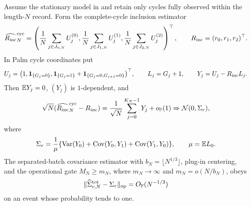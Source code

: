 \begin{paperthm}\label{thm:finite-record-inference-audit-main}
Assume the stationary model in  and
retain only cycles fully observed within the length-\(N\) record.  Form the
complete-cycle inclusion estimator
\[
\widehat{R_{\mathrm{inc}}}_N^{\rm cyc}
=\left(\frac1N\sum_{j\in J_{0,N}}U_j^{(0)},
       \frac1N\sum_{j\in J_{1,N}}U_j^{(1)},
       \frac1N\sum_{j\in J_{2,N}}U_j^{(2)}\right)^\top ,
\qquad
R_{\mathrm{inc}}=(r_0,r_1,r_2)^\top .
\]
In Palm cycle coordinates put
\[
U_j=
\bigl(1,\mathbf1_{\{G_j=0\}},
\mathbf1_{\{G_j=1\}}+\mathbf1_{\{G_j=0,G_{j+1}=0\}}\bigr)^\top,
\qquad
L_j=G_j+1,\qquad
Y_j=U_j-R_{\mathrm{inc}} L_j .
\]
Then \(\mathbb{E} Y_j=0\), \((Y_j)\) is \(1\)-dependent, and
\[
\sqrt N(\widehat{R_{\mathrm{inc}}}_N^{\rm cyc}-R_{\mathrm{inc}})
=\frac1{\sqrt N}\sum_{j=0}^{K_N-1}Y_j+o_{\mathbb{P}}(1)
\Rightarrow \mathcal N(0,\Sigma_r),
\]
where
\[
\Sigma_r=\frac1\mu\{\operatorname{Var}(Y_0)
+\operatorname{Cov}(Y_0,Y_1)+\operatorname{Cov}(Y_1,Y_0)\},
\qquad \mu=\mathbb{E} L_0 .
\]
The separated-batch covariance estimator with
\(b_N=\lfloor N^{1/3}\rfloor\), plug-in centering, and the operational gate
\(M_N\ge m_N\), where \(m_N\to\infty\) and \(m_N=o(N/b_N)\), obeys
\[
\|\widehat\Sigma_{r,N}^{\rm tot}-\Sigma_r\|_{\rm op}=O_{\mathbb{P}}(N^{-1/3})
\]
on an event whose probability tends to one.
\end{paperthm}

